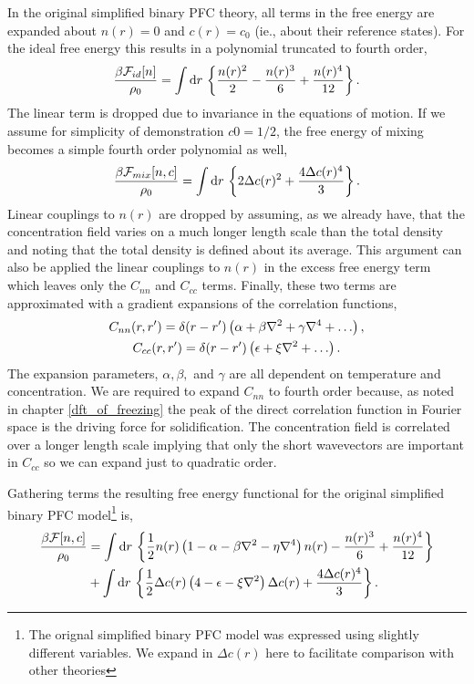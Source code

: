 In the original simplified binary PFC theory, all terms in the free energy are
expanded about $n(r) = 0$ and $c(r) = c_0$ (ie., about their reference states).
For the ideal free energy this results in a polynomial truncated to fourth
order,
%
\begin{equation}
    \frac{\beta\mathcal{F}_{id}[n]}{\rho_0} = \int \mathrm{d}r\,
    \left\lbrace \frac{n(r)^2}{2} - \frac{n(r)^3}{6} + \frac{n(r)^4}{12} \right\rbrace.
\end{equation}
%
The linear term is dropped due to invariance in the equations of motion. If we
assume for simplicity of demonstration $c0 = 1/2$, the free energy of mixing
becomes a simple fourth order polynomial as well,
%
\begin{equation}
    \frac{\beta\mathcal{F}_{mix}[n, c]}{\rho_0} = \int \mathrm{d}r\, \left\lbrace
       2\Delta c(r)^2 + \frac{4\Delta c(r)^4}{3}
    \right\rbrace.
\end{equation}
%
Linear couplings to $n(r)$ are dropped by assuming, as we already have, that
the concentration field varies on a much longer length scale than the total
density and noting that the total density is defined about its average. This
argument can also be applied the linear couplings to $n(r)$ in the excess free
energy term which leaves only the $C_{nn}$ and $C_{cc}$ terms. Finally, these
two terms are approximated with a gradient expansions of the correlation
functions,
%
\begin{gather}
    C_{nn}(r, r^\prime) = \d(r - r^\prime)\l(
        \alpha + \beta \nabla^2 + \gamma \nabla^4 + \dots\r), \\
    C_{cc}(r, r^\prime) = \d(r - r^\prime)\l(
        \epsilon + \xi \nabla^2 + \dots\r).
\end{gather}
%
The expansion parameters, $\alpha, \beta,$ and $\gamma$ are all dependent on
temperature and concentration. We are required to expand $C_{nn}$ to fourth
order because, as noted in chapter \ref{dft_of_freezing} the peak of the direct
correlation function in Fourier space is the driving force for solidification.
The concentration field is correlated over a longer length scale implying that
only the short wavevectors are important in $C_{cc}$ so we can expand just to
quadratic order.

Gathering terms the resulting free energy functional for the original simplified
binary PFC model\footnote{The orignal simplified binary PFC model was
expressed using slightly different variables. We expand in $\Delta c(r)$ here to 
facilitate comparison with other theories} is,
%
\begin{align}
    \frac{\beta\mathcal{F}[n, c]}{\rho_0} &= \int \mathrm{d}r\, \left\lbrace 
        \frac{1}{2} n(r) \left( 1 - \alpha - \beta\nabla^2 - \eta\nabla^4 \right) n(r)
      - \frac{n(r)^3}{6} + \frac{n(r)^4}{12} \right\rbrace \\
    &+ \int \mathrm{d}r\, \left\lbrace
        \frac{1}{2} \Delta c(r) \left( 4 - \epsilon - \xi\nabla^2 \right) \Delta c(r) 
      + \frac{4 \Delta c(r)^4}{3} \right\rbrace. \nonumber
\end{align}
%

